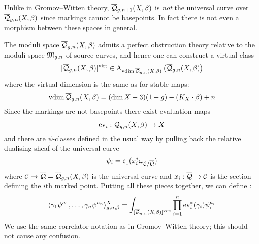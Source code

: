 
\begin{remark} Unlike in Gromov--Witten theory, $\overline{\mathcal Q}_{g,n+1}(X,\beta)$ is \emph{not} the universal curve over $\overline{\mathcal Q}_{g,n}(X,\beta)$ since markings cannot be basepoints. In fact there is not even a morphism between these spaces in general.\end{remark}

The moduli space $\overline{\mathcal Q}_{g,n}(X,\beta)$ admits a perfect obstruction theory relative to the moduli space $\mathfrak M_{g,n}$ of source curves, and hence one can construct a virtual class
\begin{equation*} [\overline{\mathcal Q}_{g,n}(X,\beta)]^{\operatorname{virt}} \in \operatorname{A}_{\operatorname{vdim}\overline{\mathcal Q}_{g,n}(X,\beta)} \left( \overline{\mathcal Q}_{g,n}(X,\beta) \right) \end{equation*}
where the virtual dimension is the same as for stable maps:
\begin{equation*} \operatorname{vdim}\overline{\mathcal Q}_{g,n}(X,\beta) = (\dim{X} - 3)(1-g) - (K_X \cdot \beta) + n \end{equation*}
Since the markings are not basepoints there exist evaluation maps
\begin{equation*} \operatorname{ev}_i : \overline{\mathcal Q}_{g,n}(X,\beta) \rightarrow X \end{equation*}
and there are $\psi$-classes defined in the usual way by pulling back the relative dualising sheaf of the universal curve
\begin{equation*} \psi_i = \operatorname{c}_1(x_i^* \omega_{\mathcal{C}/\overline{\mathcal{Q}}}) \end{equation*}
where $\mathcal{C} \rightarrow \overline{\mathcal{Q}} = \overline{\mathcal Q}_{g,n}(X,\beta)$ is the universal curve and $x_i : \overline{\mathcal{Q}} \rightarrow \mathcal{C}$ is the section defining the $i$th marked point. Putting all these pieces together, we can define :
\begin{equation*} \langle \gamma_1 \psi^{a_1} , \ldots, \gamma_n \psi^{a_n} \rangle_{g,n,\beta}^X = \int_{[\overline{\mathcal Q}_{g,n}(X,\beta)]^{\operatorname{virt}}} \prod_{i=1}^n \operatorname{ev}_i^* (\gamma_i) \psi_i^{a_i} \end{equation*}
We use the same correlator notation as in Gromov--Witten theory; this should not cause any confusion.

